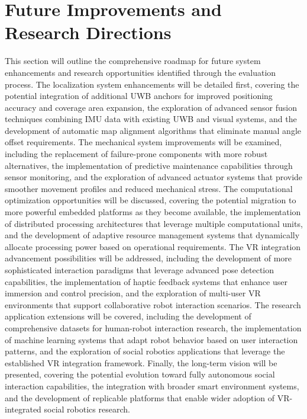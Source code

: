 \section{Future Improvements and Research Directions}
This section will outline the comprehensive roadmap for future system enhancements and research opportunities identified through the evaluation process. The localization system enhancements will be detailed first, covering the potential integration of additional UWB anchors for improved positioning accuracy and coverage area expansion, the exploration of advanced sensor fusion techniques combining IMU data with existing UWB and visual systems, and the development of automatic map alignment algorithms that eliminate manual angle offset requirements. The mechanical system improvements will be examined, including the replacement of failure-prone components with more robust alternatives, the implementation of predictive maintenance capabilities through sensor monitoring, and the exploration of advanced actuator systems that provide smoother movement profiles and reduced mechanical stress. The computational optimization opportunities will be discussed, covering the potential migration to more powerful embedded platforms as they become available, the implementation of distributed processing architectures that leverage multiple computational units, and the development of adaptive resource management systems that dynamically allocate processing power based on operational requirements. The VR integration advancement possibilities will be addressed, including the development of more sophisticated interaction paradigms that leverage advanced pose detection capabilities, the implementation of haptic feedback systems that enhance user immersion and control precision, and the exploration of multi-user VR environments that support collaborative robot interaction scenarios. The research application extensions will be covered, including the development of comprehensive datasets for human-robot interaction research, the implementation of machine learning systems that adapt robot behavior based on user interaction patterns, and the exploration of social robotics applications that leverage the established VR integration framework. Finally, the long-term vision will be presented, covering the potential evolution toward fully autonomous social interaction capabilities, the integration with broader smart environment systems, and the development of replicable platforms that enable wider adoption of VR-integrated social robotics research.


